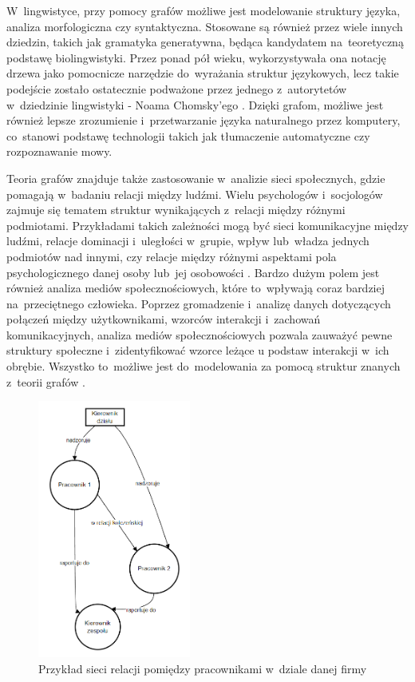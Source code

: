 W~lingwistyce, przy pomocy grafów możliwe jest modelowanie struktury języka, analiza morfologiczna czy syntaktyczna.
Stosowane są również przez wiele innych dziedzin, takich jak gramatyka generatywna,
będąca kandydatem na~teoretyczną podstawę biolingwistyki.
Przez ponad pół wieku, wykorzystywała ona notację drzewa jako pomocnicze narzędzie do~wyrażania struktur językowych,
lecz takie podejście zostało ostatecznie podważone przez jednego z~autorytetów w~dziedzinie lingwistyki - Noama Chomsky'ego \cite{Arikawa2019}.
Dzięki grafom, możliwe jest również lepsze zrozumienie i~przetwarzanie języka naturalnego przez komputery,
co~stanowi podstawę technologii takich jak tłumaczenie automatyczne czy rozpoznawanie mowy.

Teoria grafów znajduje także zastosowanie w~analizie sieci społecznych, gdzie pomagają w~badaniu relacji między ludźmi.
Wielu psychologów i~socjologów zajmuje się tematem struktur wynikających z~relacji między różnymi podmiotami.
Przykładami takich zależności mogą być sieci komunikacyjne między ludźmi, relacje dominacji i~uległości w~grupie,
wpływ lub~władza jednych podmiotów nad innymi, czy relacje między różnymi aspektami pola psychologicznego danej osoby lub~jej osobowości \cite{Harary1953}.
Bardzo dużym polem jest również analiza mediów społecznościowych, które to~wpływają coraz bardziej na~przeciętnego człowieka.
Poprzez gromadzenie i~analizę danych dotyczących połączeń między użytkownikami, wzorców interakcji i~zachowań komunikacyjnych,
analiza mediów społecznościowych pozwala zauważyć pewne struktury społeczne i~zidentyfikować wzorce leżące u podstaw interakcji w~ich obrębie.
Wszystko to~możliwe jest do~modelowania za pomocą struktur znanych z~teorii grafów \cite{Umami2024}.

\begin{figure}[ht]
	\centering
	\includegraphics[height=8.5cm]{resources/introduction/images/social.png}
	\caption{Przykład sieci relacji pomiędzy pracownikami w~dziale danej firmy}
    \label{Fig:intro-5}
\end{figure}
\FloatBarrier

